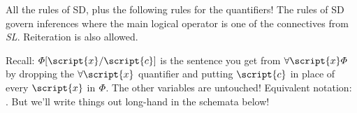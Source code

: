 All the rules of SD, plus the following rules for the quantifiers! The rules of SD govern inferences where the main logical operator is one of the connectives from {\it{SL}}. Reiteration is also allowed.


Recall: $\metaA{}\unisub{\script{x}}{\script{c}}$ is the sentence you get from $\qt{\forall}{\script{x}}\metaA{}$ by dropping the $\qt{\forall}{\script{x}}$ quantifier and putting $\script{c}$ in place of every $\script{x}$ in $\varPhi{}$. The other variables are untouched! Equivalent notation: \metaA{}\hspace{.15em}. But we'll write things out long-hand in the schemata below! 





